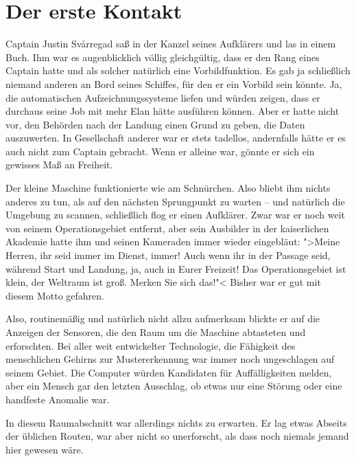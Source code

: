 
\chapter{Der erste Kontakt}

Captain Justin Svårregad saß in der Kanzel seines Aufklärers und las in einem Buch. Ihm war es augenblicklich völlig gleichgültig, dass er den Rang eines Captain hatte und als solcher natürlich eine Vorbildfunktion. Es gab ja schließlich niemand anderen an Bord seines Schiffes, für den er ein Vorbild sein könnte. Ja, die automatischen Aufzeichnungssysteme liefen und würden zeigen, dass er durchaus seine Job mit mehr Elan hätte ausführen können. Aber er hatte nicht vor, den Behörden nach der Landung einen Grund zu geben, die Daten auszuwerten. In Gesellschaft anderer war er stets tadellos, andernfalls hätte er es auch nicht zum Captain gebracht. Wenn er alleine war, gönnte er sich ein gewisses Maß an Freiheit.

Der kleine Maschine funktionierte wie am Schnürchen. Also bliebt ihm nichts anderes zu tun, als auf den nächsten Sprungpunkt zu warten -- und natürlich die Umgebung zu scannen, schließlich flog er einen Aufklärer. Zwar war er noch weit von seinem Operationsgebiet entfernt, aber sein Ausbilder in der kaiserlichen Akademie hatte ihm und seinen Kameraden immer wieder eingebläut: ">Meine Herren, ihr seid immer im Dienst, immer! Auch wenn ihr in der Passage seid, während Start und Landung, ja, auch in Eurer Freizeit! Das Operationsgebiet ist klein, der Weltraum ist groß. Merken Sie sich das!"< Bisher war er gut mit diesem Motto gefahren.

Also, routinemäßig und natürlich nicht allzu aufmerksam blickte er auf die Anzeigen der Sensoren, die den Raum um die Maschine abtasteten und erforschten. Bei aller weit entwickelter Technologie, die Fähigkeit des menschlichen Gehirns zur Mustererkennung war immer noch ungeschlagen auf seinem Gebiet. Die Computer würden Kandidaten für Auffälligkeiten melden, aber ein Mensch gar den letzten Ausschlag, ob etwas nur eine Störung oder eine handfeste Anomalie war.

In diesem Raumabschnitt war allerdings nichts zu erwarten. Er lag etwas Abseits der üblichen Routen, war aber nicht so unerforscht, als dass noch niemals jemand hier gewesen wäre.


